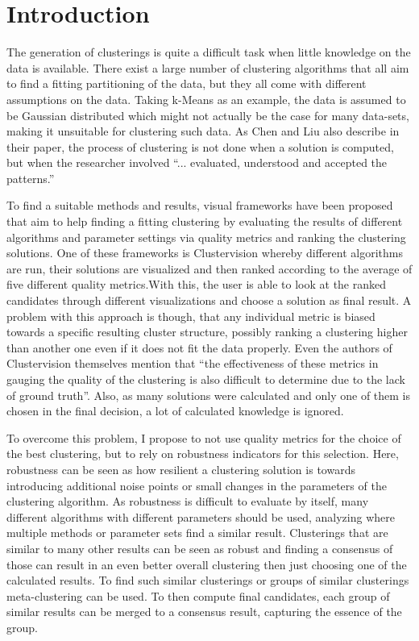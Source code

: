 \iffalse  \fi

\chapter{Introduction}
\label{cha:Introduction}

The generation of clusterings is quite a difficult task when little knowledge on the data is available. There exist a large number of clustering algorithms that all aim to find a fitting partitioning of the data, but they all come with different assumptions on the data. Taking k-Means as an example, the data is assumed to be Gaussian distributed which might not actually be the case for many data-sets, making it unsuitable for clustering such data. As Chen and Liu \cite{VISTA} also describe in their paper, the process of clustering is not done when a solution is computed, but when the researcher involved ``... evaluated, understood and accepted the patterns.''

To find a suitable methods and results, visual frameworks have been proposed that aim to help finding a fitting clustering by evaluating the results of different algorithms and parameter settings via quality metrics and ranking the clustering solutions. One of these frameworks is Clustervision \cite{Kwon2018ClustervisionVS} whereby different algorithms are run, their solutions are visualized and then ranked according to the average of five different quality metrics.With this, the user is able to look at the ranked candidates through different visualizations and choose a solution as final result. A problem with this approach is though, that any individual metric is biased towards a specific resulting cluster structure, possibly ranking a clustering higher than another one even if it does not fit the data properly. Even the authors of Clustervision themselves mention that ``the effectiveness of these metrics in gauging the quality of the clustering is also difficult to determine due to the lack of ground truth''. Also, as many solutions were calculated and only one of them is chosen in the final decision, a lot of calculated knowledge is ignored.

To overcome this problem, I propose to not use quality metrics for the choice of the best clustering, but to rely on robustness indicators for this selection. Here, robustness can be seen as how resilient a clustering solution is towards introducing additional noise points or small changes in the parameters of the clustering algorithm. As robustness is difficult to evaluate by itself, many different algorithms with different parameters should be used, analyzing where multiple methods or parameter sets find a similar result. Clusterings that are similar to many other results can be seen as robust and finding a consensus of those can result in an even better overall clustering then just choosing one of the calculated results. To find such similar clusterings or groups of similar clusterings meta-clustering can be used. To then compute final candidates, each group of similar results can be merged to a consensus result, capturing the essence of the group. 

